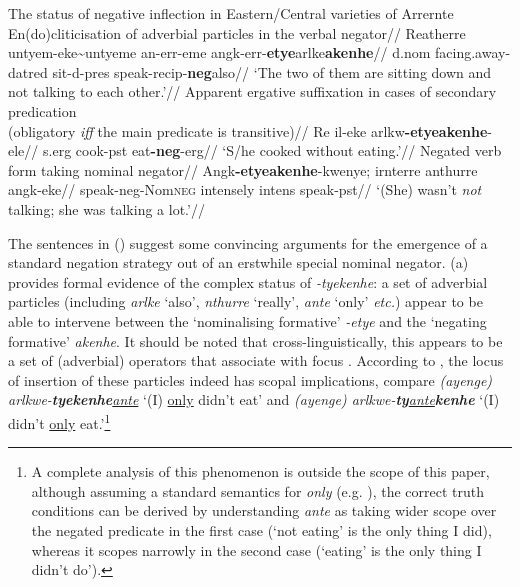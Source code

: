 \pex The status of negative inflection in Eastern/Central varieties of Arrernte
	\a\begingl\glpreamble En(do)cliticisation of adverbial particles in the verbal negator//
	\gla Re\textdblhyphen atherre untyem-eke\textasciitilde untyeme an-err-eme angk-err-\textbf{etye}\guillemotleft arlke\guillemotright \textbf{akenhe}//
		\gls{d}.\gls{nom} facing.away-\gls{dat}\textdblhyphen\gls{red} sit-\gls{d}-\gls{pres} speak-\gls{recip}-\textbf{\gls{neg}}\guillemotleft also\guillemotright//
		\glft`The two of them are sitting down and not talking to each other.'//
		\endgl
	\a\begingl\glpreamble Apparent ergative suffixation in cases of secondary predication\\(obligatory \textsl{iff} the main predicate is transitive)//
		\gla Re il-eke arlkw\textbf{-etye\textdblhyphen akenhe}-ele//
		\gls{s}.\gls{erg} cook-\gls{pst} eat\textbf{-\gls{neg}}-\gls{erg}//
		\glft`S/he cooked without eating.'//\endgl
		\a\begingl\glpreamble Negated verb form taking nominal negator//
		\gla Angk\textbf{-etye\textdblhyphen akenhe}-kwenye; irnterre anthurre angk-eke//
		\glb speak-\gls{neg}-Nom\textsc{neg} intensely \gls{intens} speak-\gls{pst}//
		\glft`(She) wasn't \textit{not} talking; she was talking a lot.'//\endgl
\xe

The sentences in (\lastx) suggest some convincing arguments for the emergence of a standard negation strategy out of an erstwhile special nominal negator. (a) provides formal evidence of the complex status of \textit{-tyekenhe}: a set of adverbial particles (including \textit{\textdblhyphen arlke} `also', \textit{\textdblhyphen nthurre} `really', \textit{\textdblhyphen ante} `only' \textit{etc.}) appear to be able to intervene between the `nominalising formative' \textit{-etye} and the `negating formative' \textit{\textdblhyphen akenhe}. It should be noted that cross-linguistically, this appears to be a set of (adverbial) operators that associate with focus \citep[e.g][]{Jackendoff1972,Rooth1985}. According to \citet[381]{Wilkins1989}, the locus of insertion of these particles indeed has scopal implications, compare \textit{(ayenge) arlkwe-\textbf{tyekenhe}\ul{\textdblhyphen ante}} `(I) \ul{only} didn't eat' and \textit{(ayenge) arlkwe-\textbf{ty}\ul{\guillemotleft ante\guillemotright}\textbf{kenhe}} `(I) didn't \ul{only} eat.'\footnote{A complete analysis of this phenomenon is outside the scope of this paper, although assuming a standard semantics for \textit{only} (e.g. \citealt{Horn1969}), the correct truth conditions can be derived by understanding \textit{\textdblhyphen ante} as taking wider scope over the negated predicate in the first case (`not eating' is the only thing I did), whereas it scopes narrowly in the second case (`eating' is the only thing I didn't do').}
 
